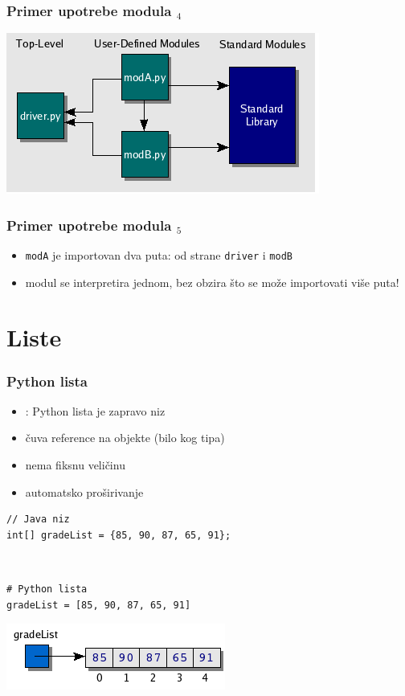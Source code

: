 \documentclass[compress]{beamer}
\begin{document}
\begin{frame}[fragile]
  \frametitle{Primer upotrebe modula $_4$}
  \begin{center}
    \includegraphics[scale=1]{pgmarch.png}
  \end{center}
\end{frame}

\begin{frame}[fragile]
  \frametitle{Primer upotrebe modula $_5$}
  \begin{itemize}
    \item \texttt{modA} je importovan dva puta: od strane \texttt{driver} i
      \texttt{modB}
    \item modul se interpretira jednom, bez obzira što se može importovati više puta!
  \end{itemize}
\end{frame}

\section{Liste}

\begin{frame}[fragile]
\frametitle{Python lista}
\begin{itemize}
  \item {}: Python lista je zapravo niz
  \item čuva reference na objekte (bilo kog tipa)
  \item nema fiksnu veličinu
  \item automatsko proširivanje
\end{itemize}

\begin{verbatim}
// Java niz
int[] gradeList = {85, 90, 87, 65, 91};
\end{verbatim}

\ %

\begin{verbatim}
# Python lista
gradeList = [85, 90, 87, 65, 91]
\end{verbatim}
\begin{center}
  \includegraphics[scale=0.7]{list.png}
\end{center}
\end{frame}
\end{document}
